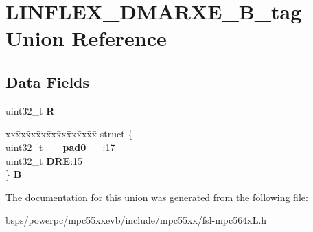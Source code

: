 \hypertarget{unionLINFLEX__DMARXE__32B__tag}{}\section{L\+I\+N\+F\+L\+E\+X\+\_\+\+D\+M\+A\+R\+X\+E\+\_\+B\+\_\+tag Union Reference}
\label{unionLINFLEX__DMARXE__32B__tag}
\subsection*{Data Fields}
\begin{DoxyCompactItemize}
\item 
\mbox{\label{unionLINFLEX__DMARXE__32B__tag_a6bd208a4a341f9ab1fea378bea5c9753}} 
uint32\+\_\+t {\bfseries R}
\item 
\mbox{\label{unionLINFLEX__DMARXE__32B__tag_a2b1c91fd96c6192fd3571e6bd5bb4d19}} 
\begin{tabbing}
xx\=xx\=xx\=xx\=xx\=xx\=xx\=xx\=xx\=\kill
struct \{\\
\>uint32\_t {\bfseries \_\_pad0\_\_}:17\\
\>uint32\_t {\bfseries DRE}:15\\
\} {\bfseries B}\\

\end{tabbing}\end{DoxyCompactItemize}


The documentation for this union was generated from the following file\+:\begin{DoxyCompactItemize}
\item 
bsps/powerpc/mpc55xxevb/include/mpc55xx/fsl-\/mpc564x\+L.\+h\end{DoxyCompactItemize}
